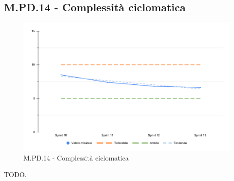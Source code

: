 \subsection{M.PD.14 - Complessità ciclomatica}

\begin{figure}[H]
  \centering
  \includegraphics[width=\textwidth]{assets/complessita_ciclomatica.pdf}
  \caption{M.PD.14 - Complessità ciclomatica}
\end{figure}

\par TODO.